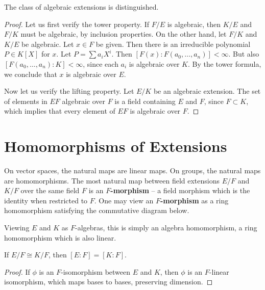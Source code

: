 \begin{theorem}
    The class of algebraic extensions is distinguished.
\end{theorem}
\begin{proof}
    Let us first verify the tower property. If $F/E$ is algebraic, then $K/E$ and $F/K$ must be algebraic, by inclusion properties. On the other hand, let $F/K$ and $K/E$ be algebraic. Let $x \in F$ be given. Then there is an irreducible polynomial $P \in K[X]$ for $x$. Let $P = \sum a_i X^i$. Then $[F(x): F(a_0, \dots, a_n)] < \infty$. But also $[F(a_0, \dots, a_n): K] < \infty$, since each $a_i$ is algebraic over $K$. By the tower formula, we conclude that $x$ is algebraic over $E$.

    Now let us verify the lifting property. Let $E/K$ be an algebraic extension. The set of elements in $EF$ algebraic over $F$ is a field containing $E$ and $F$, since $F \subset K$, which implies that every element of $EF$ is algebraic over $F$.
\end{proof}

\section{Homomorphisms of Extensions}

On vector spaces, the natural maps are linear maps. On groups, the natural maps are homomorphisms. The most natural map between field extensions $E/F$ and $K/F$ over the same field $F$ is an {\bf $F$-morphism} -- a field morphism which is the identity when restricted to $F$. One may view an {\bf $F$-morphism} as a ring homomorphism satisfying the commutative diagram below.
%
\begin{center}
\end{center}
%
Viewing $E$ and $K$ as $F$-algebras, this is simply an algebra homomorphism, a ring homomorphism which is also linear.

\begin{lemma}
    If $E/F \cong K/F$, then $[E:F] = [K:F]$.
\end{lemma}
\begin{proof}
    If $\phi$ is an $F$-isomorphism between $E$ and $K$, then $\phi$ is an $F$-linear isomorphism, which maps bases to bases, preserving dimension.
\end{proof}

